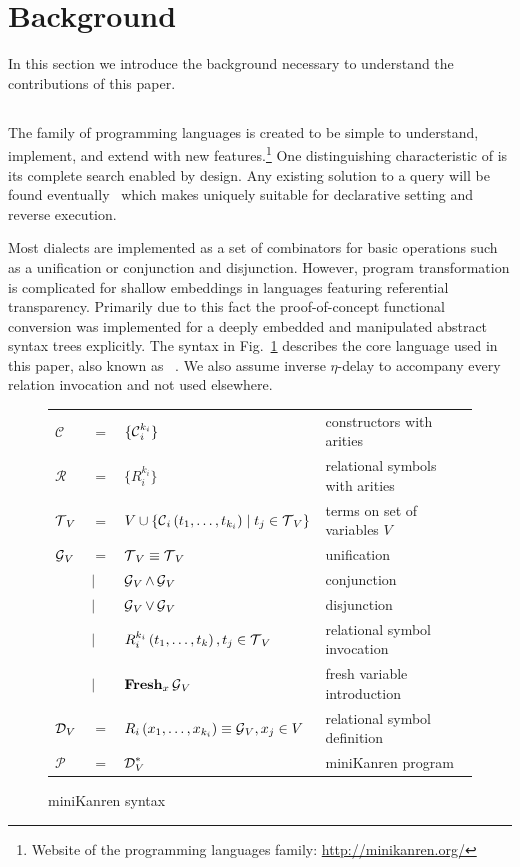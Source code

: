 \section{Background}

In this section we introduce the background necessary to understand the contributions of this paper. 

\subsection{\mk}

The \mk family of programming languages is created to be simple to understand, implement, and extend with new features.\footnote{Website of the \mk programming languages family: \url{http://minikanren.org/}} 
One distinguishing characteristic of \mk is its complete search enabled by design. 
Any existing solution to a query will be found eventually~\cite{rozplokhas2020certified} which makes \mk uniquely suitable for declarative setting and reverse execution. 

Most \mk dialects are implemented as a set of combinators for basic operations such as a unification or conjunction and disjunction. 
However, program transformation is complicated for shallow embeddings in languages featuring referential transparency. 
Primarily due to this fact the proof-of-concept functional conversion was implemented for a deeply embedded \mk and manipulated abstract syntax trees explicitly. 
The syntax in Fig.~\ref{fig:minikanren} describes the core language used in this paper, also known as \micro~\cite{friedman2013mukanren}. 
We also assume inverse $\eta$-delay to accompany every relation invocation and not used elsewhere.  

\begin{figure}[h]
\begin{tabular}{llll}
    $\mathcal{C}$ & $=$ & $\{\operatorname{\mathcal{C}}_{i}^{k_{i}}\} $ & constructors with arities \\
    $\mathcal{R}$ & $=$ & $\{R_{i}^{k_{i}}\} $ & relational symbols with arities \\
    $\operatorname{\mathcal{T}}_{V}$ & $=$ & $V \cup \{\operatorname{\mathcal{C}}_{i}\left( t_1, \ldots, t_{k_{i}} \right) \mid t_{j}\in \operatorname{\mathcal{T}}_{V}\} $ & terms on set of variables $V$ \\
 $\operatorname{\mathcal{G}}_{V}$ & $=$ & $\operatorname{\mathcal{T}}_{V} \equiv \operatorname{\mathcal{T}}_{V}$ & unification \\
 & $\mid$ & $\operatorname{\mathcal{G}}_{V} \land \operatorname{\mathcal{G}}_{V}$ & conjunction  \\
 & $\mid$ & $\operatorname{\mathcal{G}}_{V} \lor \operatorname{\mathcal{G}}_{V}$ & disjunction  \\
 & $\mid$ & $R_{i}^{k_{i}}\left( t_1, \ldots, t_{k} \right), t_{j}\in \operatorname{\mathcal{T}}_{V}$ & relational symbol invocation\\
 & $\mid$ & $\operatorname{\mathbf{Fresh}}_{x} \operatorname{\mathcal{G}}_{V}$ & fresh variable introduction  \\
 $\operatorname{\mathcal{D}}_{V}$ & $=$ & $R_{i}\left( x_1, \ldots, x_{k_{i}} \right) \equiv \operatorname{\mathcal{G}}_{V}, x_{j}\in V$ & relational symbol definition \\
  $\mathcal{P}$ & $=$ & $\operatorname{\mathcal{D}}_{V}^*$ & miniKanren program
\end{tabular}
\caption{miniKanren syntax}
\label{fig:minikanren}
\end{figure}

